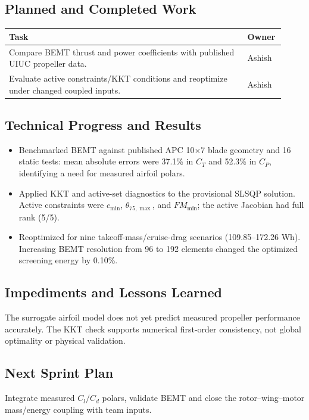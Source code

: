 \subsection*{Planned and Completed Work}
\begin{table}[htbp]
\centering
\renewcommand{\arraystretch}{1.05}
\setlength{\tabcolsep}{4pt}
\begin{tabular}{@{}p{0.82\linewidth}p{0.10\linewidth}@{}}
\toprule
\textbf{Task} & \textbf{Owner} \\
\midrule
Compare BEMT thrust and power coefficients with published UIUC propeller data. & Ashish \\
Evaluate active constraints/KKT conditions and reoptimize under changed coupled inputs. & Ashish \\
\bottomrule
\end{tabular}
\end{table}

\subsection*{Technical Progress and Results}
\begin{itemize}[leftmargin=*,nosep]
    \item Benchmarked BEMT against published APC 10$\times$7 blade geometry and 16 static tests: mean absolute errors were 37.1\% in $C_T$ and 52.3\% in $C_P$, identifying a need for measured airfoil polars.
    \item Applied KKT and active-set diagnostics to the provisional SLSQP solution. Active constraints were $c_{\min}$, $\theta_{75,\max}$, and $FM_{\min}$; the active Jacobian had full rank (5/5).
    \item Reoptimized for nine takeoff-mass/cruise-drag scenarios (109.85--172.26 Wh). Increasing BEMT resolution from 96 to 192 elements changed the optimized screening energy by 0.10\%.
\end{itemize}

\subsection*{Impediments and Lessons Learned}
The surrogate airfoil model does not yet predict measured propeller performance accurately. The KKT check supports numerical first-order consistency, not global optimality or physical validation.

\subsection*{Next Sprint Plan}
Integrate measured $C_l/C_d$ polars, validate BEMT and close the rotor--wing--motor mass/energy coupling with team inputs.
